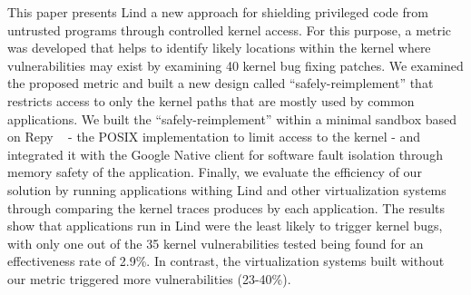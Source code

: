



This paper presents Lind a new approach for shielding privileged code from untrusted programs through controlled kernel access. For this purpose, a metric was developed that helps to identify likely locations within the kernel where vulnerabilities may exist by examining 40 kernel bug fixing patches. We examined the proposed metric and built a new design %
called ``safely-reimplement'' that restricts access to only the
kernel paths that are mostly used by common applications. 
We built the  ``safely-reimplement'' within a minimal sandbox based on Repy ~\cite{Repy-10} - the POSIX implementation to limit access to the kernel - and  integrated it with the Google Native client for software fault isolation through memory safety of the application. Finally, we evaluate the efficiency of our solution by running applications withing Lind and other virtualization systems through comparing the kernel traces produces by each application. The results show that applications run in Lind were the least likely to trigger kernel bugs, with only one out of the 35 kernel vulnerabilities tested being found for an effectiveness rate of 2.9\%. In contrast, the virtualization systems built without our metric triggered more vulnerabilities (23-40\%).  

